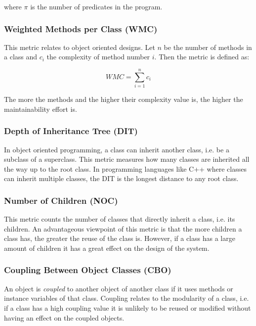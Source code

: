 where $\pi$ is the number of predicates in the program.

\subsubsection{Weighted Methods per Class (WMC)}

This metric relates to object oriented designs. Let $n$ be the number of
methods in a class and $c_i$ the complexity of method number $i$. Then the
metric is defined as:

$$
WMC = \sum_{i=1}^nc_i
$$

The more the methods and the higher their complexity value is, the higher the
maintainability effort is. \cite{chidamber1994metrics}

\subsubsection{Depth of Inheritance Tree (DIT)}

In object oriented programming, a class can inherit another class, i.e. be a
subclass of a superclass. This metric measures how many classes are inherited
all the way up to the root class. In programming languages like C++ where
classes can inherit multiple classes, the DIT is the longest distance to any
root class. \cite{chidamber1994metrics}

\subsubsection{Number of Children (NOC)}

This metric counts the number of classes that directly inherit a class, i.e.
its children. An advantageous viewpoint of this metric is that the more
children a class has, the greater the reuse of the class is. However, if a
class has a large amount of children it has a great effect on the design of the
system. \cite{chidamber1994metrics}

\subsubsection{Coupling Between Object Classes (CBO)}

An object is \textit{coupled} to another object of another class if it uses
methods or instance variables of that class. Coupling relates to the modularity
of a class, i.e. if a class has a high coupling value it is unlikely to be
reused or modified without having an effect on the coupled objects.
\cite{chidamber1994metrics}

